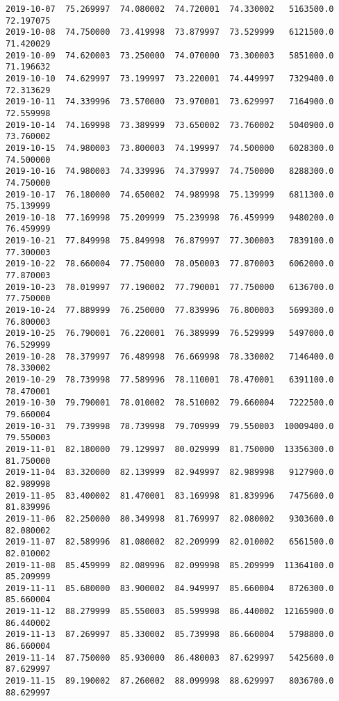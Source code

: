 \documentclass[11pt]{article}
\begin{document}
\begin{Verbatim}[commandchars=\\\{\}]
2019-10-07  75.269997  74.080002  74.720001  74.330002   5163500.0  72.197075
2019-10-08  74.750000  73.419998  73.879997  73.529999   6121500.0  71.420029
2019-10-09  74.620003  73.250000  74.070000  73.300003   5851000.0  71.196632
2019-10-10  74.629997  73.199997  73.220001  74.449997   7329400.0  72.313629
2019-10-11  74.339996  73.570000  73.970001  73.629997   7164900.0  72.559998
2019-10-14  74.169998  73.389999  73.650002  73.760002   5040900.0  73.760002
2019-10-15  74.980003  73.800003  74.199997  74.500000   6028300.0  74.500000
2019-10-16  74.980003  74.339996  74.379997  74.750000   8288300.0  74.750000
2019-10-17  76.180000  74.650002  74.989998  75.139999   6811300.0  75.139999
2019-10-18  77.169998  75.209999  75.239998  76.459999   9480200.0  76.459999
2019-10-21  77.849998  75.849998  76.879997  77.300003   7839100.0  77.300003
2019-10-22  78.660004  77.750000  78.050003  77.870003   6062000.0  77.870003
2019-10-23  78.019997  77.190002  77.790001  77.750000   6136700.0  77.750000
2019-10-24  77.889999  76.250000  77.839996  76.800003   5699300.0  76.800003
2019-10-25  76.790001  76.220001  76.389999  76.529999   5497000.0  76.529999
2019-10-28  78.379997  76.489998  76.669998  78.330002   7146400.0  78.330002
2019-10-29  78.739998  77.589996  78.110001  78.470001   6391100.0  78.470001
2019-10-30  79.790001  78.010002  78.510002  79.660004   7222500.0  79.660004
2019-10-31  79.739998  78.739998  79.709999  79.550003  10009400.0  79.550003
2019-11-01  82.180000  79.129997  80.029999  81.750000  13356300.0  81.750000
2019-11-04  83.320000  82.139999  82.949997  82.989998   9127900.0  82.989998
2019-11-05  83.400002  81.470001  83.169998  81.839996   7475600.0  81.839996
2019-11-06  82.250000  80.349998  81.769997  82.080002   9303600.0  82.080002
2019-11-07  82.589996  81.080002  82.209999  82.010002   6561500.0  82.010002
2019-11-08  85.459999  82.089996  82.099998  85.209999  11364100.0  85.209999
2019-11-11  85.680000  83.900002  84.949997  85.660004   8726300.0  85.660004
2019-11-12  88.279999  85.550003  85.599998  86.440002  12165900.0  86.440002
2019-11-13  87.269997  85.330002  85.739998  86.660004   5798800.0  86.660004
2019-11-14  87.750000  85.930000  86.480003  87.629997   5425600.0  87.629997
2019-11-15  89.190002  87.260002  88.099998  88.629997   8036700.0  88.629997


\end{Verbatim}
\end{document}
